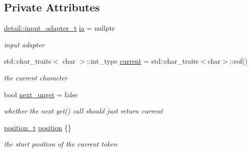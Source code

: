 \subsection*{Private Attributes}
\begin{DoxyCompactItemize}
\item 
\mbox{\label{classnlohmann_1_1detail_1_1lexer_aa7e69cd9d51451fd798eaf501b40421f}} 
\mbox{\hyperlink{namespacenlohmann_1_1detail_ae132f8cd5bb24c5e9b40ad0eafedf1c2}{detail\+::input\+\_\+adapter\+\_\+t}} \mbox{\hyperlink{classnlohmann_1_1detail_1_1lexer_aa7e69cd9d51451fd798eaf501b40421f}{ia}} = nullptr
\begin{DoxyCompactList}\small\item\em input adapter \end{DoxyCompactList}\item 
\mbox{\label{classnlohmann_1_1detail_1_1lexer_a47169f9aaf0da4c9885e61d3109859aa}} 
std\+::char\+\_\+traits$<$ char $>$\+::int\+\_\+type \mbox{\hyperlink{classnlohmann_1_1detail_1_1lexer_a47169f9aaf0da4c9885e61d3109859aa}{current}} = std\+::char\+\_\+traits$<$char$>$\+::eof()
\begin{DoxyCompactList}\small\item\em the current character \end{DoxyCompactList}\item 
\mbox{\label{classnlohmann_1_1detail_1_1lexer_ae8bedb97b907ba6347c5b2f2666ca01f}} 
bool \mbox{\hyperlink{classnlohmann_1_1detail_1_1lexer_ae8bedb97b907ba6347c5b2f2666ca01f}{next\+\_\+unget}} = false
\begin{DoxyCompactList}\small\item\em whether the next get() call should just return current \end{DoxyCompactList}\item 
\mbox{\label{classnlohmann_1_1detail_1_1lexer_a932a1b4133619f08fc7442b52368385e}} 
\mbox{\hyperlink{structnlohmann_1_1detail_1_1position__t}{position\+\_\+t}} \mbox{\hyperlink{classnlohmann_1_1detail_1_1lexer_a932a1b4133619f08fc7442b52368385e}{position}} \{\}
\begin{DoxyCompactList}\small\item\em the start position of the current token \end{DoxyCompactList}\item 

\end{DoxyCompactItemize}
